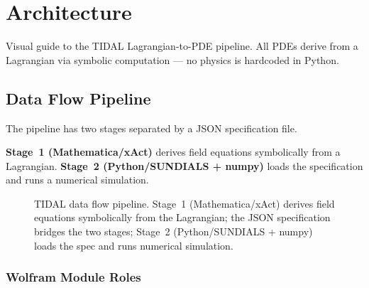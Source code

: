 
\section{Architecture}
\label{sec:architecture}

Visual guide to the TIDAL Lagrangian-to-PDE pipeline.
All PDEs derive from a Lagrangian via symbolic computation --- no physics is hardcoded in Python.

\subsection{Data Flow Pipeline}
\label{sec:data-flow-pipeline}

The pipeline has two stages separated by a JSON specification file.

\textbf{Stage~1 (Mathematica/xAct)} derives field equations symbolically from a Lagrangian.
\textbf{Stage~2 (Python/SUNDIALS + numpy)} loads the specification and runs a numerical simulation.

\begin{figure}[htbp]
\centering

\caption{TIDAL data flow pipeline. Stage~1 (Mathematica/xAct) derives field equations symbolically from the Lagrangian; the JSON specification bridges the two stages; Stage~2 (Python/SUNDIALS + numpy) loads the spec and runs numerical simulation.}
\label{fig:pipeline-overview}
\end{figure}

\subsubsection{Wolfram Module Roles}
\label{sec:wolfram-module-roles}

